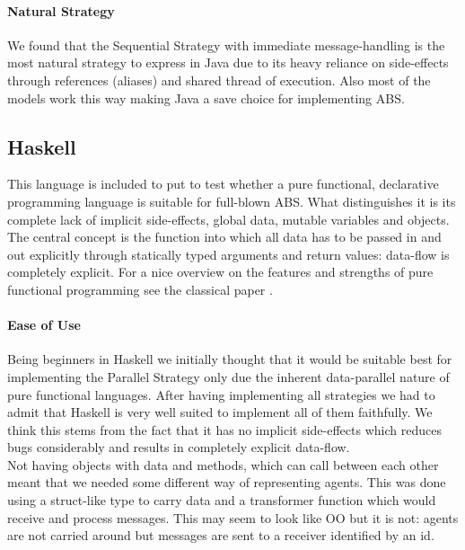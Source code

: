 \paragraph{Natural Strategy}
We found that the Sequential Strategy with immediate message-handling is the most natural strategy to express in Java due to its heavy reliance on side-effects through references (aliases) and shared thread of execution. Also most of the models work this way making Java a save choice for implementing ABS.





 
\subsection{Haskell}
This language is included to put to test whether a pure functional, declarative programming language is suitable for full-blown ABS. What distinguishes it is its complete lack of implicit side-effects, global data, mutable variables and objects. The central concept is the function into which all data has to be passed in and out explicitly through statically typed arguments and return values: data-flow is completely explicit. For a nice overview on the features and strengths of pure functional programming see the classical paper  \cite{hughes_why_1989}.

\paragraph{Ease of Use}
Being beginners in Haskell we initially thought that it would be suitable best for implementing the Parallel Strategy only due the inherent data-parallel nature of pure functional languages. After having implementing all strategies we had to admit that Haskell is very well suited to implement all of them faithfully. We think this stems from the fact that it has no implicit side-effects which reduces bugs considerably and results in completely explicit data-flow. \\

Not having objects with data and methods, which can call between each other meant that we needed some different way of representing agents. This was done using a struct-like type to carry data and a transformer function which would receive and process messages. This may seem to look like OO but it is not: agents are not carried around but messages are sent to a receiver identified by an id.

